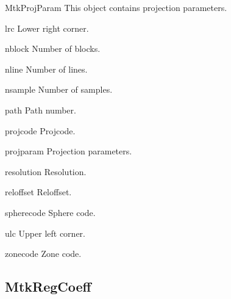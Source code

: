\documentclass{howto}
\begin{document}
\begin{classdesc*}{MtkProjParam}
  This object contains projection parameters.
\end{classdesc*}

\begin{memberdesc}[tuple]{lrc}
  Lower right corner.
\end{memberdesc}

\begin{memberdesc}[int]{nblock}
  Number of blocks.
\end{memberdesc}

\begin{memberdesc}[int]{nline}
  Number of lines.
\end{memberdesc}

\begin{memberdesc}[int]{nsample}
  Number of samples.
\end{memberdesc}

\begin{memberdesc}[int]{path}
  Path number.
\end{memberdesc}

\begin{memberdesc}[long]{projcode}
  Projcode.
\end{memberdesc}

\begin{memberdesc}[tuple]{projparam}
  Projection parameters.
\end{memberdesc}

\begin{memberdesc}[int]{resolution}
  Resolution.
\end{memberdesc}

\begin{memberdesc}[tuple]{reloffset}
  Reloffset.
\end{memberdesc}

\begin{memberdesc}[long]{spherecode}
  Sphere code.
\end{memberdesc}

\begin{memberdesc}[tuple]{ulc}
  Upper left corner.
\end{memberdesc}

\begin{memberdesc}[long]{zonecode}
  Zone code.
\end{memberdesc}

\subsection{MtkRegCoeff \label{mtkregcoeff}}
\end{document}
